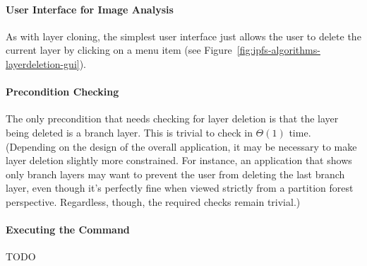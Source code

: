 \paragraph{User Interface for Image Analysis}

As with layer cloning, the simplest user interface just allows the user to delete the current layer by clicking on a menu item (see Figure~\ref{fig:ipfs-algorithms-layerdeletion-gui}).


\paragraph{Precondition Checking}

The only precondition that needs checking for layer deletion is that the layer being deleted is a branch layer. This is trivial to check in $\Theta(1)$ time. (Depending on the design of the overall application, it may be necessary to make layer deletion slightly more constrained. For instance, an application that shows only branch layers may want to prevent the user from deleting the last branch layer, even though it's perfectly fine when viewed strictly from a partition forest perspective. Regardless, though, the required checks remain trivial.)

\paragraph{Executing the Command}

TODO